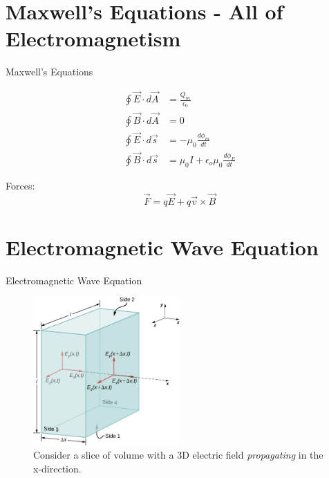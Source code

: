 \documentclass{beamer}
\begin{document}
\section{Maxwell's Equations - All of Electromagnetism}

\begin{frame}{Maxwell's Equations}
\begin{tcolorbox}[colback=white,colframe=black!100!black,title=Maxwell's Equations]
\begin{align}
\oint \vec{E} \cdot d\vec{A} &= \frac{Q_{in}}{\epsilon_0} \\
\oint \vec{B} \cdot d\vec{A} &= 0 \\
\oint \vec{E} \cdot d\vec{s} &= -\mu_0 \frac{d\phi_m}{dt} \\
\oint \vec{B} \cdot d\vec{s} &= \mu_0 I + \epsilon_o \mu_0 \frac{d\phi_E}{dt}
\end{align}
\end{tcolorbox}
Forces:
\begin{equation}
\vec{F} = q \vec{E} + q\vec{v} \times \vec{B}
\end{equation}
\end{frame}

\section{Electromagnetic Wave Equation}

\begin{frame}{Electromagnetic Wave Equation}
\begin{figure}
\centering
\includegraphics[width=0.5\textwidth]{figures/wave1.jpeg}
\caption{\label{fig:wave1} Consider a slice of volume with a 3D electric field \textit{propagating} in the x-direction.}
\end{figure}
\end{frame}
\end{document}
